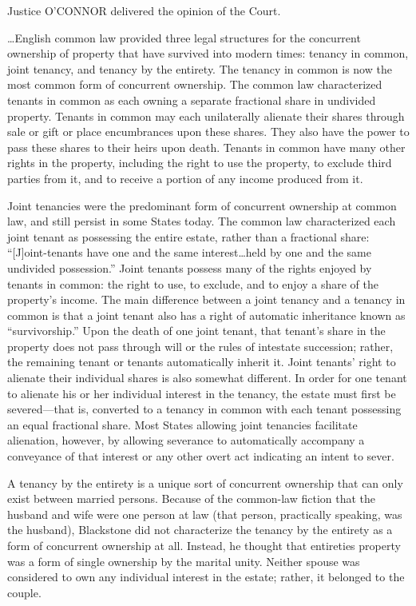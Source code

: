 

Justice O'CONNOR delivered the opinion of the Court.

\dots English common law provided three legal structures for the concurrent
ownership of property that have survived into modern times: tenancy in common,
joint tenancy, and tenancy by the entirety. The tenancy in common is now the
most common form of concurrent ownership. The common law characterized tenants
in common as each owning a separate fractional share in undivided property.
Tenants in common may each unilaterally alienate their shares through sale or
gift or place encumbrances upon these shares. They also have the power to pass
these shares to their heirs upon death. Tenants in common have many other
rights in the property, including the right to use the property, to exclude
third parties from it, and to receive a portion of any income produced from it.


Joint tenancies were the predominant form of concurrent ownership at common law,
and still persist in some States today. The common law characterized each joint
tenant as possessing the entire estate, rather than a fractional share:
``[J]oint-tenants have one and the same interest\dots held by one and the
same undivided possession.'' Joint tenants possess many of the rights enjoyed
by tenants in common: the right to use, to exclude, and to enjoy a share of the
property's income. The main difference between a joint tenancy and a tenancy in
common is that a joint tenant also has a right of automatic inheritance known
as ``survivorship.'' Upon the death of one joint tenant, that tenant's share in
the property does not pass through will or the rules of intestate succession;
rather, the remaining tenant or tenants automatically inherit it. Joint
tenants' right to alienate their individual shares is also somewhat different.
In order for one tenant to alienate his or her individual interest in the
tenancy, the estate must first be severed---that is, converted to a tenancy in
common with each tenant possessing an equal fractional share. Most States
allowing joint tenancies facilitate alienation, however, by allowing severance
to automatically accompany a conveyance of that interest or any other overt act
indicating an intent to sever.

A tenancy by the entirety is a unique sort of concurrent ownership that can only
exist between married persons. Because of the common-law fiction that the
husband and wife were one person at law (that person, practically speaking, was
the husband), Blackstone did not characterize the tenancy by the entirety as a
form of concurrent ownership at all. Instead, he thought that entireties
property was a form of single ownership by the marital unity. Neither spouse
was considered to own any individual interest in the estate; rather, it
belonged to the couple.

